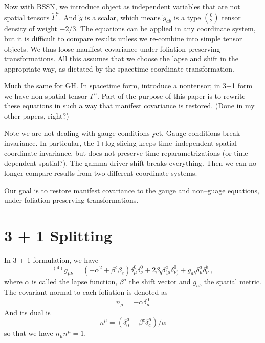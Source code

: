 \documentclass[letterpaper,nofootinbib,prd,amsmath,onecolumn]{revtex4-1}
\begin{document}
Now with BSSN, we introduce object as independent variables that are not spatial tensors $\tilde\Gamma^a$. 
And $\tilde g$ is a scalar, which means $\tilde g_{ab}$ is a type $0\choose 2$ tensor density of 
weight $-2/3$. The equations can be applied in any coordinate 
system, but it is difficult to  compare results unless we re-combine into simple tensor objects. 
We thus loose manifest covariance under foliation preserving transformations. All this assumes that we choose the 
lapse and shift in the appropriate way, as dictated by the spacetime coordinate transformation. 

Much the same for GH. In spacetime form, introduce 
a nontensor; in 3+1 form we have non spatial tensor $\Gamma^a$. Part of the purpose of this paper is to rewrite 
these equations in such a way that manifest covariance is restored. (Done in my other papers, right?) 

Note we are not dealing with gauge conditions yet. Gauge conditions break invariance. In particular, the 
1+log slicing keeps time--independent spatial coordinate invariance, but does not preserve time 
reparametrizations (or time--dependent spatial?). The gamma driver shift breaks everything. Then we 
can no longer compare results from two different coordinate systems. 

Our goal is to restore manifest covariance to the gauge and non--guage equations, under 
foliation preserving transformations. 

\section{3 + 1 Splitting}\label{3+1}
In 3 + 1 formulation, we have
\begin{equation*}
	{}^{(4)}g_{\mu\nu} = (-\alpha^2 + \beta^{c}\beta_{c})\delta_\mu^0\delta_\nu^0 
	+ 2\beta_{b}\delta_{(\mu}^a\delta_{\nu)}^0 + g_{ab} \delta^a_\mu \delta^b_\nu \ ,
\end{equation*}
where $\alpha$ is called the lapse function, $\beta^{a}$ the shift vector and $g_{ab}$ the spatial metric. The covariant normal to each foliation is denoted as
\begin{equation}\label{normal covector}
n_{\mu} = -\alpha\delta^{0}_{\mu}
\end{equation}
 And its dual is
\begin{equation}\label{normal vector}
n^{\mu} = (\delta^{\mu}_{0} - \beta^{c}\delta^{\mu}_{c})/\alpha
\end{equation}
so that we have $n_{\mu}n^{\mu} = 1$. 
\end{document}
